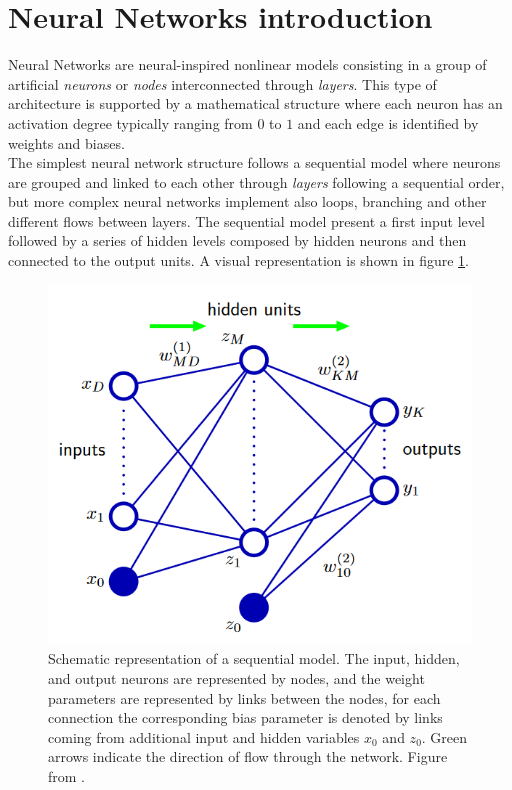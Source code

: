 \section{Neural Networks introduction}
Neural Networks are neural-inspired nonlinear models consisting in a group of artificial \textit{neurons} or \textit{nodes} interconnected through \textit{layers}. This type of architecture is supported by a mathematical structure where each neuron has an activation degree typically ranging from $0$ to $1$ and each edge is identified by weights and biases.\\

The simplest neural network structure follows a sequential model where neurons are grouped and linked to each other through \textit{layers} following a sequential order, but more complex neural networks implement also loops, branching and other different flows between layers.
The sequential model present a first input level followed by a series of hidden levels composed by hidden neurons and then connected to the output units. A visual representation is shown in figure \ref{fig:NN_art}.\\

\begin{figure}
	\centering
	\includegraphics[width=.6\textwidth]{IMG/Cap6/NN_art.png}
	\caption{Schematic representation of a sequential model. The input, hidden, and output neurons are represented by nodes, and the weight parameters are represented by links between the nodes, for each connection the corresponding bias parameter is denoted by links coming from additional input and hidden variables $x_0$ and $z_0$. Green arrows indicate the direction of flow through the network. Figure from \cite{NN_Bishop}.}
	\label{fig:NN_art}
\end{figure}

